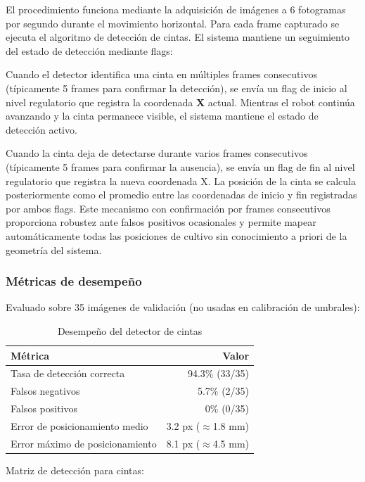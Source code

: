 El procedimiento funciona mediante la adquisición de imágenes a 6 fotogramas por segundo durante el movimiento horizontal. Para cada frame capturado se ejecuta el algoritmo de detección de cintas. El sistema mantiene un seguimiento del estado de detección mediante flags:

Cuando el detector identifica una cinta en múltiples frames consecutivos (típicamente 5 frames para confirmar la detección), se envía un flag de inicio al nivel regulatorio que registra la coordenada \textbf{X} actual. Mientras el robot continúa avanzando y la cinta permanece visible, el sistema mantiene el estado de detección activo.

Cuando la cinta deja de detectarse durante varios frames consecutivos (típicamente 5 frames para confirmar la ausencia), se envía un flag de fin al nivel regulatorio que registra la nueva coordenada X. La posición de la cinta se calcula posteriormente como el promedio entre las coordenadas de inicio y fin registradas por ambos flags. Este mecanismo con confirmación por frames consecutivos proporciona robustez ante falsos positivos ocasionales y permite mapear automáticamente todas las posiciones de cultivo sin conocimiento a priori de la geometría del sistema.

\subsubsection{Métricas de desempeño}
Evaluado sobre 35 imágenes de validación (no usadas en calibración de umbrales):

\begin{table}[H]
\centering
\begin{tabular}{|l|r|}
\hline
\textbf{Métrica} & \textbf{Valor} \\ \hline
Tasa de detección correcta & 94.3\% (33/35) \\ \hline
Falsos negativos & 5.7\% (2/35) \\ \hline
Falsos positivos & 0\% (0/35) \\ \hline
Error de posicionamiento medio & 3.2 px ($\approx$1.8 mm) \\ \hline
Error máximo de posicionamiento & 8.1 px ($\approx$4.5 mm) \\ \hline
\end{tabular}
\caption{Desempeño del detector de cintas}
\label{tab:metricas_cintas}
\end{table}

Matriz de detección para cintas:

